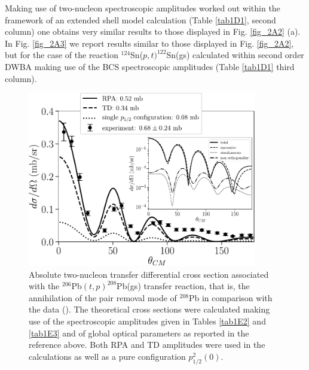  Making use of two-nucleon spectroscopic amplitudes worked out within the framework of an extended shell model calculation (Table \ref{tab1D1}, second column) one obtains very similar results to those displayed in Fig. \ref{fig_2A2} (a). In Fig. \ref{fig_2A3} we report results similar to those displayed in Fig. \ref{fig_2A2}, but for the case of the reaction $^{124}$Sn($p,t)^{122}$Sn(gs) calculated within second order DWBA making use of the BCS spectroscopic amplitudes (Table \ref{tab1D1} third column). 


    \begin{figure}
    \centerline{\includegraphics*[width=10cm,angle=0]{nutshell/figs/tp_Pb_contributions-v2.pdf}}
    \caption{Absolute two-nucleon transfer differential cross section associated with the $^{206}$Pb$(t,p)^{208}$Pb(gs) transfer reaction, that is, the annihilation of the pair removal mode of $^{208}$Pb in comparison with the data (\cite{Bjerregaard:66b}). The theoretical cross sections were calculated making use of the spectroscopic amplitudes given in Tables \ref{tab1E2} and \ref{tab1E3} and of global optical parameters as reported in the reference above. Both  RPA and TD amplitudes were used in the calculations as well as a pure configuration $p_{1/2}^2(0)$. 
    }\label{fig2A4}
    \end{figure}

